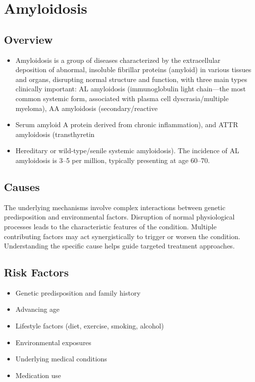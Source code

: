 \chapter{Amyloidosis}
\label{sec:Amyloidosis}

\section{Overview}


\begin{itemize}[noitemsep]
  \item Amyloidosis is a group of diseases characterized by the extracellular deposition of abnormal, insoluble fibrillar proteins (amyloid) in various tissues and organs, disrupting normal structure and function, with three main types clinically important: AL amyloidosis (immunoglobulin light chain---the most common systemic form, associated with plasma cell dyscrasia/multiple myeloma), AA amyloidosis (secondary/reactive
  \item Serum amyloid A protein derived from chronic inflammation), and ATTR amyloidosis (transthyretin
  \item Hereditary or wild-type/senile systemic amyloidosis). The incidence of AL amyloidosis is 3--5 per million, typically presenting at age 60--70.
\end{itemize}
\section{Causes}
The underlying mechanisms involve complex interactions between genetic predisposition and environmental factors. Disruption of normal physiological processes leads to the characteristic features of the condition. Multiple contributing factors may act synergistically to trigger or worsen the condition. Understanding the specific cause helps guide targeted treatment approaches.
\section{Risk Factors}


\begin{itemize}[noitemsep]
  \item Genetic predisposition and family history
  \item Advancing age
  \item Lifestyle factors (diet, exercise, smoking, alcohol)
  \item Environmental exposures
  \item Underlying medical conditions
  \item Medication use
\end{itemize}
